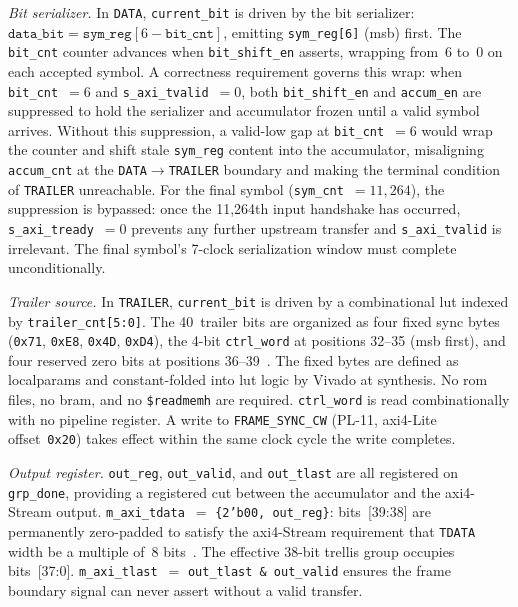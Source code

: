 \textit{Bit serializer.}
In \texttt{DATA}, \texttt{current\_bit} is driven by the bit serializer:
$\mathtt{data\_bit} = \mathtt{sym\_reg}[6 - \mathtt{bit\_cnt}]$, emitting
\texttt{sym\_reg[6]} (\ac{msb}) first.
The \texttt{bit\_cnt} counter advances when \texttt{bit\_shift\_en} asserts,
wrapping from~6 to~0 on each accepted symbol.
A correctness requirement governs this wrap: when \texttt{bit\_cnt}~$= 6$
and \texttt{s\_axi\_tvalid}~$= 0$, both \texttt{bit\_shift\_en} and
\texttt{accum\_en} are suppressed to hold the serializer and accumulator
frozen until a valid symbol arrives.
Without this suppression, a valid-low gap at \texttt{bit\_cnt}~$= 6$ would
wrap the counter and shift stale \texttt{sym\_reg} content into the
accumulator, misaligning \texttt{accum\_cnt} at the
\texttt{DATA}$\to$\texttt{TRAILER} boundary and making the terminal condition
of \texttt{TRAILER} unreachable.
For the final symbol (\texttt{sym\_cnt}~$= 11{,}264$), the suppression is
bypassed: once the 11{,}264th input handshake has occurred,
\texttt{s\_axi\_tready}~$= 0$ prevents any further upstream transfer and
\texttt{s\_axi\_tvalid} is irrelevant. The final symbol's 7-clock
serialization window must complete unconditionally.

\textit{Trailer source.}
In \texttt{TRAILER}, \texttt{current\_bit} is driven by a combinational
\ac{lut} indexed by \texttt{trailer\_cnt[5:0]}.
The 40~trailer bits are organized as four fixed sync bytes
(\texttt{0x71}, \texttt{0xE8}, \texttt{0x4D}, \texttt{0xD4}),
the 4-bit \texttt{ctrl\_word} at positions 32--35 (\ac{msb} first), and
four reserved zero bits at positions 36--39~\cite{ITU_J83}.
The fixed bytes are defined as localparams and constant-folded into
\ac{lut} logic by Vivado at synthesis. No \ac{rom} files, no \ac{bram},
and no \texttt{\$readmemh} are required.
\texttt{ctrl\_word} is read combinationally with no pipeline register.
A write to \texttt{FRAME\_SYNC\_CW} (PL-11, \ac{axi}4-Lite
offset~\texttt{0x20}) takes effect within the same clock cycle the write
completes.

\textit{Output register.}
\texttt{out\_reg}, \texttt{out\_valid}, and \texttt{out\_tlast} are all
registered on \texttt{grp\_done}, providing a registered cut between the
accumulator and the \ac{axi}4-Stream output.
\texttt{m\_axi\_tdata}~$=$ \texttt{\{2'b00, out\_reg\}}: bits~[39:38] are
permanently zero-padded to satisfy the \ac{axi}4-Stream requirement that
\texttt{TDATA} width be a multiple of~8 bits~\cite{ARM_IHI0022}. The
effective 38-bit trellis group occupies bits~[37:0].
\texttt{m\_axi\_tlast}~$=$ \texttt{out\_tlast \&\ out\_valid} ensures the
frame boundary signal can never assert without a valid transfer.

